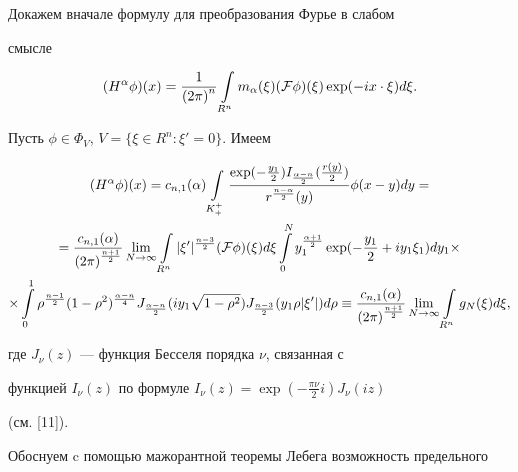 \begin{pf}


Докажем вначале формулу для преобразования Фурье в слабом


смысле


\begin{equation}


(H^\alpha\phi)(x)=\frac{1}{{(2\pi)}^n}\Intr m_\alpha(\xi)(\F\phi)(\xi)


\exp(-ix\cdot\xi)d\xi.


\end{equation}


Пусть $\phi\in {\Phi}_V$, $V = \{\xi\in R^n: \xi'=0\}$. Имеем


\begin{multline}


(H^{\alpha}\phi)(x)=c_{n,1}(\alpha)\int\limits_{K_+^+}\frac{\exp(-\frac


{y_1}{2})I_{\frac{\alpha-n}{2}}(\frac{r(y)}{2})}{r^{\frac{n-\alpha}{2}}(y)}


\phi (x-y)dy= \\


%


=\frac{c_{n,1}(\alpha)}{{(2\pi)}^{\frac{n+1}{2}}}\lim\limits_{N\to\infty}


\int\limits_{R^n}|\xi'|^{\frac{n-3}{2}}(\F\phi)(\xi)d\xi\int


\limits_0^Ny_1^{\frac{\alpha+1}{2}}\exp(-\frac{y_1}{2}+


iy_1\xi_1)dy_1\times \\


%


\times\int\limits_0^1\rho^{\frac{n-1}{2}}(1-\rho^2)^{\frac{\alpha-n}{4}}


J_{\frac{\alpha-n}{2}}(iy_1\sqrt{1-\rho^2})J_{\frac{n-3}{2}}(y_1\rho


|\xi'|)d\rho\equiv


\frac{c_{n,1}(\alpha)}{{(2\pi)}^{\frac{n+1}{2}}}\lim\limits_{N\to\infty}


\int\limits_{R^n}g_N(\xi)d\xi,


\end{multline}


где $J_\nu(z)$ --- функция Бесселя порядка $\nu$, связанная с


функцией $I_\nu(z)$ по формуле $I_\nu(z)=\exp(-\frac{\pi\nu}{2}i)J_\nu(iz)$


(см. [11]).


Обоснуем c помощью мажорантной теоремы Лебега возможность предельного



\end{pf}
